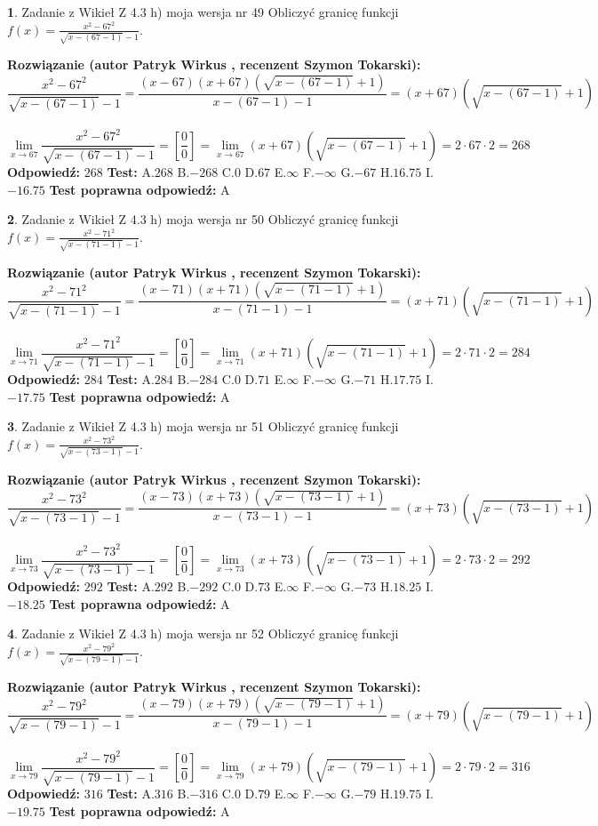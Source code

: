 \documentclass[12pt, a4paper]{article}
\theoremstyle{definition} %
\newtheorem{zad}{}
\newcommand{\zadStart}[1]{\begin{zad}#1\newline}
\newcommand{\zadStop}{\end{zad}}
\newcommand{\rozwStart}[2]{\noindent \textbf{Rozwiązanie (autor #1 , recenzent #2): }\newline}
\newcommand{\rozwStop}{\newline}
\newcommand{\odpStart}{\noindent \textbf{Odpowiedź:}\newline}
\newcommand{\odpStop}{\newline}
\newcommand{\testStart}{\noindent \textbf{Test:}\newline}
\newcommand{\testStop}{\newline}
\newcommand{\kluczStart}{\noindent \textbf{Test poprawna odpowiedź:}\newline}
\newcommand{\kluczStop}{\newline}
\begin{document}
\zadStart{Zadanie z Wikieł Z 4.3 h) moja wersja nr 49}
Obliczyć granicę funkcji $f(x)=\frac{x^{2} - 67^{2}}{\sqrt{x-(67-1)}-1}$.
\zadStop
\rozwStart{Patryk Wirkus}{Szymon Tokarski}
$$\frac{x^{2} - 67^{2}}{\sqrt{x-(67-1)}-1}=\frac{(x-67)(x+67)(\sqrt{x-(67-1)}+1)}{x-(67-1)-1}=(x+67)(\sqrt{x-(67-1)}+1)$$
\\
$$\lim\limits_{x\to 67}\frac{x^{2} - 67^{2}}{\sqrt{x-(67-1)}-1}=[\frac{0}{0}]=
\lim\limits_{x\to 67}(x+67)(\sqrt{x-(67-1)}+1) = 2\cdot67 \cdot 2 = 268$$
\rozwStop
\odpStart
$268$
\odpStop
\testStart
A.$268$
B.$-268$
C.$0$
D.$67$
E.$\infty$
F.$-\infty$
G.$-67$
H.$16.75$
I.$-16.75$
\testStop
\kluczStart
A
\kluczStop



\zadStart{Zadanie z Wikieł Z 4.3 h) moja wersja nr 50}
Obliczyć granicę funkcji $f(x)=\frac{x^{2} - 71^{2}}{\sqrt{x-(71-1)}-1}$.
\zadStop
\rozwStart{Patryk Wirkus}{Szymon Tokarski}
$$\frac{x^{2} - 71^{2}}{\sqrt{x-(71-1)}-1}=\frac{(x-71)(x+71)(\sqrt{x-(71-1)}+1)}{x-(71-1)-1}=(x+71)(\sqrt{x-(71-1)}+1)$$
\\
$$\lim\limits_{x\to 71}\frac{x^{2} - 71^{2}}{\sqrt{x-(71-1)}-1}=[\frac{0}{0}]=
\lim\limits_{x\to 71}(x+71)(\sqrt{x-(71-1)}+1) = 2\cdot71 \cdot 2 = 284$$
\rozwStop
\odpStart
$284$
\odpStop
\testStart
A.$284$
B.$-284$
C.$0$
D.$71$
E.$\infty$
F.$-\infty$
G.$-71$
H.$17.75$
I.$-17.75$
\testStop
\kluczStart
A
\kluczStop



\zadStart{Zadanie z Wikieł Z 4.3 h) moja wersja nr 51}
Obliczyć granicę funkcji $f(x)=\frac{x^{2} - 73^{2}}{\sqrt{x-(73-1)}-1}$.
\zadStop
\rozwStart{Patryk Wirkus}{Szymon Tokarski}
$$\frac{x^{2} - 73^{2}}{\sqrt{x-(73-1)}-1}=\frac{(x-73)(x+73)(\sqrt{x-(73-1)}+1)}{x-(73-1)-1}=(x+73)(\sqrt{x-(73-1)}+1)$$
\\
$$\lim\limits_{x\to 73}\frac{x^{2} - 73^{2}}{\sqrt{x-(73-1)}-1}=[\frac{0}{0}]=
\lim\limits_{x\to 73}(x+73)(\sqrt{x-(73-1)}+1) = 2\cdot73 \cdot 2 = 292$$
\rozwStop
\odpStart
$292$
\odpStop
\testStart
A.$292$
B.$-292$
C.$0$
D.$73$
E.$\infty$
F.$-\infty$
G.$-73$
H.$18.25$
I.$-18.25$
\testStop
\kluczStart
A
\kluczStop



\zadStart{Zadanie z Wikieł Z 4.3 h) moja wersja nr 52}
Obliczyć granicę funkcji $f(x)=\frac{x^{2} - 79^{2}}{\sqrt{x-(79-1)}-1}$.
\zadStop
\rozwStart{Patryk Wirkus}{Szymon Tokarski}
$$\frac{x^{2} - 79^{2}}{\sqrt{x-(79-1)}-1}=\frac{(x-79)(x+79)(\sqrt{x-(79-1)}+1)}{x-(79-1)-1}=(x+79)(\sqrt{x-(79-1)}+1)$$
\\
$$\lim\limits_{x\to 79}\frac{x^{2} - 79^{2}}{\sqrt{x-(79-1)}-1}=[\frac{0}{0}]=
\lim\limits_{x\to 79}(x+79)(\sqrt{x-(79-1)}+1) = 2\cdot79 \cdot 2 = 316$$
\rozwStop
\odpStart
$316$
\odpStop
\testStart
A.$316$
B.$-316$
C.$0$
D.$79$
E.$\infty$
F.$-\infty$
G.$-79$
H.$19.75$
I.$-19.75$
\testStop
\kluczStart
A
\kluczStop
\end{document}
